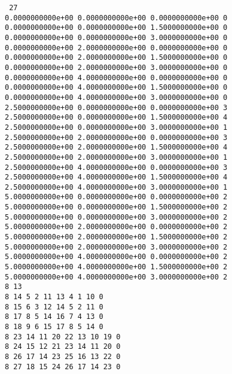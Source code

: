 \documentclass[12pt]{book}
\begin{document}
\noindent
{\tt
27\\
0.0000000000e+00 0.0000000000e+00 0.0000000000e+00 0\\
0.0000000000e+00 0.0000000000e+00 1.5000000000e+00 0\\
0.0000000000e+00 0.0000000000e+00 3.0000000000e+00 0\\
0.0000000000e+00 2.0000000000e+00 0.0000000000e+00 0\\
0.0000000000e+00 2.0000000000e+00 1.5000000000e+00 0\\
0.0000000000e+00 2.0000000000e+00 3.0000000000e+00 0\\
0.0000000000e+00 4.0000000000e+00 0.0000000000e+00 0\\
0.0000000000e+00 4.0000000000e+00 1.5000000000e+00 0\\
0.0000000000e+00 4.0000000000e+00 3.0000000000e+00 0\\
2.5000000000e+00 0.0000000000e+00 0.0000000000e+00 3\\
2.5000000000e+00 0.0000000000e+00 1.5000000000e+00 4\\
2.5000000000e+00 0.0000000000e+00 3.0000000000e+00 1\\
2.5000000000e+00 2.0000000000e+00 0.0000000000e+00 3\\
2.5000000000e+00 2.0000000000e+00 1.5000000000e+00 4\\
2.5000000000e+00 2.0000000000e+00 3.0000000000e+00 1\\
2.5000000000e+00 4.0000000000e+00 0.0000000000e+00 3\\
2.5000000000e+00 4.0000000000e+00 1.5000000000e+00 4\\
2.5000000000e+00 4.0000000000e+00 3.0000000000e+00 1\\
5.0000000000e+00 0.0000000000e+00 0.0000000000e+00 2\\
5.0000000000e+00 0.0000000000e+00 1.5000000000e+00 2\\
5.0000000000e+00 0.0000000000e+00 3.0000000000e+00 2\\
5.0000000000e+00 2.0000000000e+00 0.0000000000e+00 2\\
5.0000000000e+00 2.0000000000e+00 1.5000000000e+00 2\\
5.0000000000e+00 2.0000000000e+00 3.0000000000e+00 2\\
5.0000000000e+00 4.0000000000e+00 0.0000000000e+00 2\\
5.0000000000e+00 4.0000000000e+00 1.5000000000e+00 2\\
5.0000000000e+00 4.0000000000e+00 3.0000000000e+00 2\\
8 13\\
8 14 5 2 11 13 4 1 10 0\\
8 15 6 3 12 14 5 2 11 0\\
8 17 8 5 14 16 7 4 13 0\\
8 18 9 6 15 17 8 5 14 0\\
8 23 14 11 20 22 13 10 19 0\\
8 24 15 12 21 23 14 11 20 0\\
8 26 17 14 23 25 16 13 22 0\\
8 27 18 15 24 26 17 14 23 0\\
}
\end{document}
